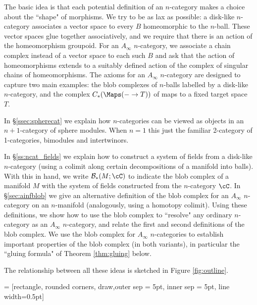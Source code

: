 The basic idea is that each potential definition of an $n$-category makes a choice about the ``shape" of morphisms.
We try to be as lax as possible: a disk-like $n$-category associates a 
vector space to every $B$ homeomorphic to the $n$-ball.
These vector spaces glue together associatively, and we require that there is an action of the homeomorphism groupoid.
For an $A_\infty$ $n$-category, we associate a chain complex instead of a vector space to 
each such $B$ and ask that the action of 
homeomorphisms extends to a suitably defined action of the complex of singular chains of homeomorphisms.
The axioms for an $A_\infty$ $n$-category are designed to capture two main examples: 
the blob complexes of $n$-balls labelled by a 
disk-like $n$-category, and the complex $\CM{-}{T}$ of maps to a fixed target space $T$.

In \S \ref{ssec:spherecat} we explain how $n$-categories can be viewed as objects in an $n{+}1$-category 
of sphere modules.
When $n=1$ this just the familiar 2-category of 1-categories, bimodules and intertwinors.

In \S \ref{ss:ncat_fields}  we explain how to construct a system of fields from a disk-like $n$-category 
(using a colimit along certain decompositions of a manifold into balls). 
With this in hand, we write $\bc_*(M; \cC)$ to indicate the blob complex of a manifold $M$ 
with the system of fields constructed from the $n$-category $\cC$. 
In \S \ref{sec:ainfblob} we give an alternative definition 
of the blob complex for an $A_\infty$ $n$-category on an $n$-manifold (analogously, using a homotopy colimit).
Using these definitions, we show how to use the blob complex to ``resolve" any ordinary $n$-category as an 
$A_\infty$ $n$-category, and relate the first and second definitions of the blob complex.
We use the blob complex for $A_\infty$ $n$-categories to establish important properties of the blob complex (in both variants), 
in particular the ``gluing formula" of Theorem \ref{thm:gluing} below.

The relationship between all these ideas is sketched in Figure \ref{fig:outline}.

 = [rectangle, rounded corners, draw,outer sep = 5pt, inner sep = 5pt, line width=0.5pt]

